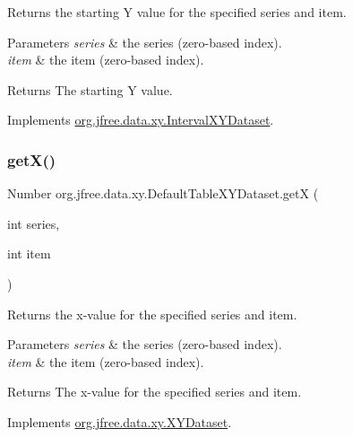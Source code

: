 Returns the starting Y value for the specified series and item.


\begin{DoxyParams}{Parameters}
{\em series} & the series (zero-\/based index). \\
\hline
{\em item} & the item (zero-\/based index).\\
\hline
\end{DoxyParams}
\begin{DoxyReturn}{Returns}
The starting Y value. 
\end{DoxyReturn}


Implements \mbox{\hyperlink{interfaceorg_1_1jfree_1_1data_1_1xy_1_1_interval_x_y_dataset_afdd414735adb233734bc35b76a005ed9}{org.\+jfree.\+data.\+xy.\+Interval\+X\+Y\+Dataset}}.

\mbox{\label{classorg_1_1jfree_1_1data_1_1xy_1_1_default_table_x_y_dataset_ab2d943baa055ad2ba480f27d0293a0f8}} 
\subsubsection{\texorpdfstring{get\+X()}{getX()}}
{\footnotesize\ttfamily Number org.\+jfree.\+data.\+xy.\+Default\+Table\+X\+Y\+Dataset.\+getX (\begin{DoxyParamCaption}\item[{int}]{series,  }\item[{int}]{item }\end{DoxyParamCaption})}

Returns the x-\/value for the specified series and item.


\begin{DoxyParams}{Parameters}
{\em series} & the series (zero-\/based index). \\
\hline
{\em item} & the item (zero-\/based index).\\
\hline
\end{DoxyParams}
\begin{DoxyReturn}{Returns}
The x-\/value for the specified series and item. 
\end{DoxyReturn}


Implements \mbox{\hyperlink{interfaceorg_1_1jfree_1_1data_1_1xy_1_1_x_y_dataset_a85c75ba5b69b551e96afd29d1732ba22}{org.\+jfree.\+data.\+xy.\+X\+Y\+Dataset}}.

